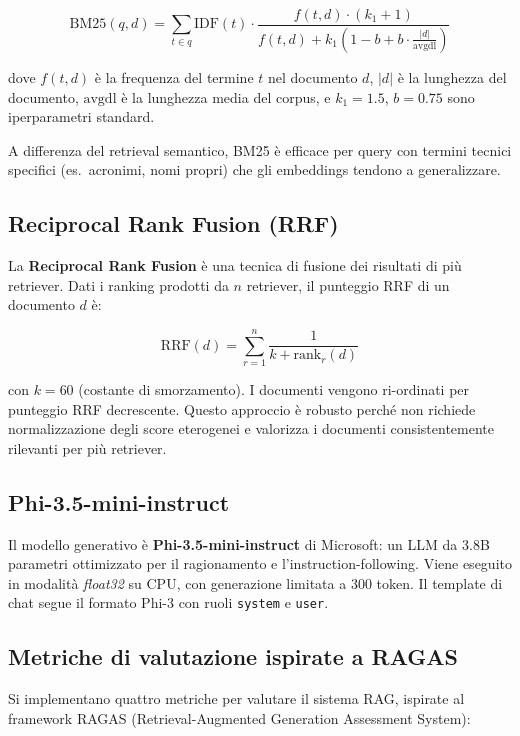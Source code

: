 \documentclass[12pt,a4paper]{article}
\begin{document}
\[
  \text{BM25}(q, d) = \sum_{t \in q} \text{IDF}(t) \cdot
  \frac{f(t,d) \cdot (k_1+1)}{f(t,d) + k_1 \left(1 - b + b \cdot \frac{|d|}{\text{avgdl}}\right)}
\]

dove $f(t,d)$ \`e la frequenza del termine $t$ nel documento $d$, $|d|$ \`e la lunghezza del documento, $\text{avgdl}$ \`e la lunghezza media del corpus, e $k_1 = 1.5$, $b = 0.75$ sono iperparametri standard.

A differenza del retrieval semantico, BM25 \`e efficace per query con termini tecnici specifici (es.\ acronimi, nomi propri) che gli embeddings tendono a generalizzare.

\subsection{Reciprocal Rank Fusion (RRF)}

La \textbf{Reciprocal Rank Fusion} \`e una tecnica di fusione dei risultati di pi\`u retriever. Dati i ranking prodotti da $n$ retriever, il punteggio RRF di un documento $d$ \`e:

\[
  \text{RRF}(d) = \sum_{r=1}^{n} \frac{1}{k + \text{rank}_r(d)}
\]

con $k=60$ (costante di smorzamento). I documenti vengono ri-ordinati per punteggio RRF decrescente. Questo approccio \`e robusto perch\'e non richiede normalizzazione degli score eterogenei e valorizza i documenti consistentemente rilevanti per pi\`u retriever.

\subsection{Phi-3.5-mini-instruct}

Il modello generativo \`e \textbf{Phi-3.5-mini-instruct} di Microsoft: un LLM da 3.8B parametri ottimizzato per il ragionamento e l'instruction-following. Viene eseguito in modalit\`a \textit{float32} su CPU, con generazione limitata a 300 token. Il template di chat segue il formato Phi-3 con ruoli \texttt{system} e \texttt{user}.

\subsection{Metriche di valutazione ispirate a RAGAS}

Si implementano quattro metriche per valutare il sistema RAG, ispirate al framework RAGAS (Retrieval-Augmented Generation Assessment System):
\end{document}
